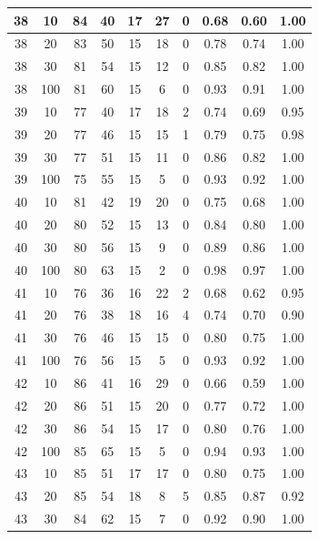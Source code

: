 \begin{longtable}{ |c|c|c|c|c|c|c|c|c|c| }
            38 & 10 & 84 & 40 & 17 & 27 & 0 & 0.68 & 0.60 & 1.00 \\ \hline
            38 & 20 & 83 & 50 & 15 & 18 & 0 & 0.78 & 0.74 & 1.00 \\ \hline
            38 & 30 & 81 & 54 & 15 & 12 & 0 & 0.85 & 0.82 & 1.00 \\ \hline
            38 & 100 & 81 & 60 & 15 & 6 & 0 & 0.93 & 0.91 & 1.00 \\ \hline
            39 & 10 & 77 & 40 & 17 & 18 & 2 & 0.74 & 0.69 & 0.95 \\ \hline
            39 & 20 & 77 & 46 & 15 & 15 & 1 & 0.79 & 0.75 & 0.98 \\ \hline
            39 & 30 & 77 & 51 & 15 & 11 & 0 & 0.86 & 0.82 & 1.00 \\ \hline
            39 & 100 & 75 & 55 & 15 & 5 & 0 & 0.93 & 0.92 & 1.00 \\ \hline
            40 & 10 & 81 & 42 & 19 & 20 & 0 & 0.75 & 0.68 & 1.00 \\ \hline
            40 & 20 & 80 & 52 & 15 & 13 & 0 & 0.84 & 0.80 & 1.00 \\ \hline
            40 & 30 & 80 & 56 & 15 & 9 & 0 & 0.89 & 0.86 & 1.00 \\ \hline
            40 & 100 & 80 & 63 & 15 & 2 & 0 & 0.98 & 0.97 & 1.00 \\ \hline
            41 & 10 & 76 & 36 & 16 & 22 & 2 & 0.68 & 0.62 & 0.95 \\ \hline
            41 & 20 & 76 & 38 & 18 & 16 & 4 & 0.74 & 0.70 & 0.90 \\ \hline
            41 & 30 & 76 & 46 & 15 & 15 & 0 & 0.80 & 0.75 & 1.00 \\ \hline
            41 & 100 & 76 & 56 & 15 & 5 & 0 & 0.93 & 0.92 & 1.00 \\ \hline
            42 & 10 & 86 & 41 & 16 & 29 & 0 & 0.66 & 0.59 & 1.00 \\ \hline
            42 & 20 & 86 & 51 & 15 & 20 & 0 & 0.77 & 0.72 & 1.00 \\ \hline
            42 & 30 & 86 & 54 & 15 & 17 & 0 & 0.80 & 0.76 & 1.00 \\ \hline
            42 & 100 & 85 & 65 & 15 & 5 & 0 & 0.94 & 0.93 & 1.00 \\ \hline
            43 & 10 & 85 & 51 & 17 & 17 & 0 & 0.80 & 0.75 & 1.00 \\ \hline
            43 & 20 & 85 & 54 & 18 & 8 & 5 & 0.85 & 0.87 & 0.92 \\ \hline
            43 & 30 & 84 & 62 & 15 & 7 & 0 & 0.92 & 0.90 & 1.00 \\ \hline

\end{longtable}
